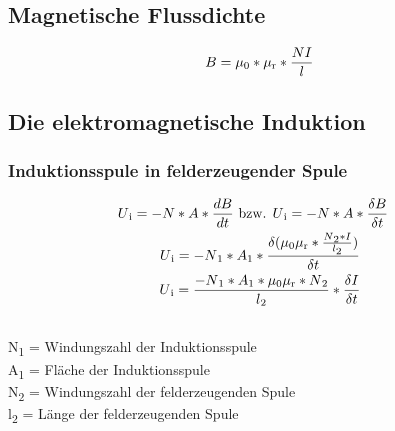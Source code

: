 \documentclass{scrartcl}
\begin{document}
        \subsection*{Magnetische Flussdichte}
        \begin{equation}
            \begin{multlined}
                B = \mu\textsubscript{0}*\mu\textsubscript{r}*\frac{NI}{l} 
            \end{multlined}
        \end{equation}
        \subsection*{Die elektromagnetische Induktion}
        \subsubsection*{Induktionsspule in felderzeugender Spule}
        \begin{equation}
            \begin{multlined}
                U\textsubscript{i} = -N*A*\frac{dB}{dt} \text{ bzw. } 
                U\textsubscript{i} = -N*A*\frac{\delta B}{\delta t} \\
                U\textsubscript{i} = -N\textsubscript{1}*A\textsubscript{1}*\frac{\delta(\mu\textsubscript{0}\mu\textsubscript{r}*\frac{N\textsubscript{2}*I}{l\textsubscript{2}})}{\delta t} \\
                U\textsubscript{i} = \frac{-N\textsubscript{1}*A\textsubscript{1}*\mu\textsubscript{0}\mu\textsubscript{r}*N\textsubscript{2}}{l\textsubscript{2}}*\frac{\delta I}{\delta t} \\
            \end{multlined}
        \end{equation}
        N\textsubscript{1} = Windungszahl der Induktionsspule \\
        A\textsubscript{1} = Fläche der Induktionsspule \\
        N\textsubscript{2} = Windungszahl der felderzeugenden Spule \\
        l\textsubscript{2} = Länge der felderzeugenden Spule \\
\end{document}
